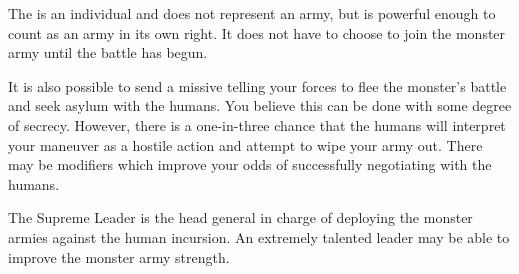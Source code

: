 \documentclass[green]{guildcamp2}
\begin{document}
The \cSphinx{} is an individual and does not represent an army, but is powerful enough to count as an army in its own right. It does not have to choose to join the monster army until the battle has begun.

It is also possible to send a missive telling your forces to flee the monster's battle and seek asylum with the humans. You believe this can be done with some degree of secrecy. However, there is a one-in-three chance that the humans will interpret your maneuver as a hostile action and attempt to wipe your army out. There may be modifiers which improve your odds of successfully negotiating with the humans.

The Supreme Leader is the head general in charge of deploying the monster armies against the human incursion. An extremely talented leader may be able to improve the monster army strength.
\end{document}
